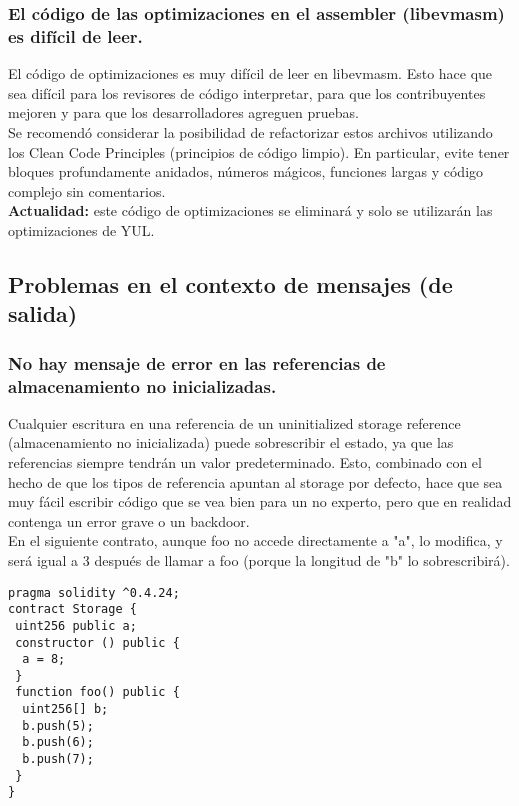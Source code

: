\subsubsection{El código de las optimizaciones en el assembler (libevmasm) es difícil de leer.}

El código de optimizaciones es muy difícil de leer en libevmasm. Esto hace que sea difícil para los revisores de código interpretar, para que los contribuyentes mejoren y para que los desarrolladores agreguen pruebas.\\

Se recomendó considerar la posibilidad de refactorizar estos archivos utilizando los Clean Code Principles (principios de código limpio). En particular, evite tener bloques profundamente anidados, números mágicos, funciones largas y código complejo sin comentarios.\\

\textbf{Actualidad:} este código de optimizaciones se eliminará y solo se utilizarán las optimizaciones de YUL.

\subsection{Problemas en el contexto de mensajes (de salida)}

\subsubsection{No hay mensaje de error en las referencias de almacenamiento no inicializadas.}

Cualquier escritura en una referencia de un uninitialized storage reference (almacenamiento no inicializada) puede sobrescribir el estado, ya que las referencias siempre tendrán un valor predeterminado. Esto, combinado con el hecho de que los tipos de referencia apuntan al storage por defecto, hace que sea muy fácil escribir código que se vea bien para un no experto, pero que en realidad contenga un error grave o un backdoor.\\

En el siguiente contrato, aunque foo no accede directamente a "a", lo modifica, y será igual a 3 después de llamar a foo (porque la longitud de "b" lo sobrescribirá).\\

\begin{lstlisting}[language=Solidity]
pragma solidity ^0.4.24;
contract Storage {
 uint256 public a;
 constructor () public {
  a = 8;
 }
 function foo() public {
  uint256[] b;
  b.push(5);
  b.push(6);
  b.push(7);
 }
}
\end{lstlisting}

